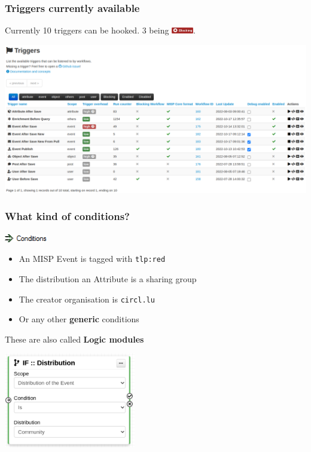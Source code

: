 \begin{frame}
    \frametitle{Triggers currently available}
    Currently 10 triggers can be hooked. 3 being \includegraphics[width=36px]{pictures/blocking-workflow.png}.
    \begin{center}
        \includegraphics[width=1.0\linewidth]{pictures/triggers.png}
    \end{center}
\end{frame}

\begin{frame}
    \frametitle{What kind of conditions?}
    \vspace*{0.25em}
    \includegraphics[width=70px]{pictures/sc-condition.png}
    \vspace*{0.25em}
    \begin{itemize}
        \item An MISP Event is tagged with \texttt{tlp:red}
        \item The distribution an Attribute is a sharing group
        \item The creator organisation is \texttt{circl.lu}
        \item Or any other \textbf{generic} conditions
    \end{itemize}

    \vspace*{0.5em}
    {\Large {}} These are also called \textbf{Logic modules}
    \begin{center}
        \includegraphics[width=0.43\textwidth]{pictures/logic-module.png}
    \end{center}
\end{frame}

